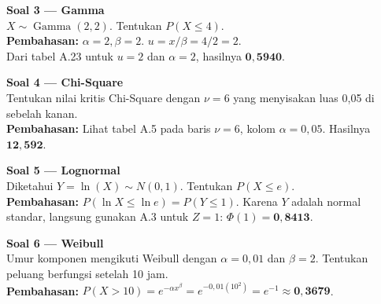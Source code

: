 \documentclass[12pt, a4paper]{article}
\begin{document}
\textbf{Soal 3 — Gamma} \\
$X \sim \operatorname{Gamma}(2, 2)$. Tentukan $P(X \le 4)$. \\
\textbf{Pembahasan:} $\alpha = 2, \beta = 2$. $u = x/\beta = 4/2 = 2$. \\
Dari tabel A.23 untuk $u=2$ dan $\alpha=2$, hasilnya $\mathbf{0{,}5940}$.

\textbf{Soal 4 — Chi-Square} \\
Tentukan nilai kritis Chi-Square dengan $\nu=6$ yang menyisakan luas 0,05 di sebelah kanan. \\
\textbf{Pembahasan:} Lihat tabel A.5 pada baris $\nu=6$, kolom $\alpha=0{,}05$. Hasilnya $\mathbf{12{,}592}$.

\textbf{Soal 5 — Lognormal} \\
Diketahui $Y = \ln(X) \sim N(0, 1)$. Tentukan $P(X \le e)$. \\
\textbf{Pembahasan:} $P(\ln X \le \ln e) = P(Y \le 1)$. Karena $Y$ adalah normal standar, langsung gunakan A.3 untuk $Z=1$: $\Phi(1) = \mathbf{0{,}8413}$.

\textbf{Soal 6 — Weibull} \\
Umur komponen mengikuti Weibull dengan $\alpha=0{,}01$ dan $\beta=2$. Tentukan peluang berfungsi setelah 10 jam. \\
\textbf{Pembahasan:} $P(X > 10) = e^{-\alpha x^\beta} = e^{-0{,}01(10^2)} = e^{-1} \approx \mathbf{0{,}3679}$.
\end{document}
